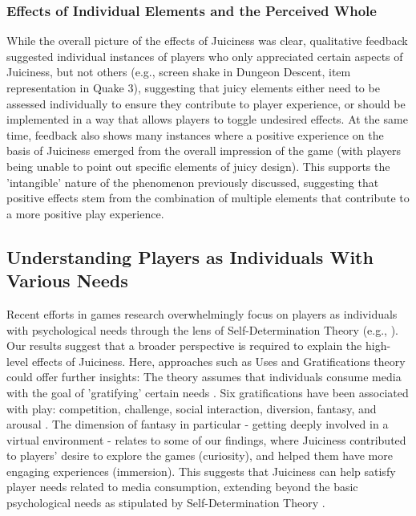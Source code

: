 \documentclass{sigchi}
\begin{document}
\subsubsection{Effects of Individual Elements and the Perceived Whole} While the overall picture of the effects of Juiciness was clear, qualitative feedback suggested individual instances of players who only appreciated certain aspects of Juiciness, but not others (e.g., screen shake in Dungeon Descent, item representation in Quake 3), suggesting that juicy elements either need to be assessed individually to ensure they contribute to player experience, or should be implemented in a way that allows players to toggle undesired effects. At the same time, feedback also shows many instances where a positive experience on the basis of Juiciness emerged from the overall impression of the game (with players being unable to point out specific elements of juicy design). This supports the 'intangible' nature of the phenomenon previously discussed, suggesting that positive effects stem from the combination of multiple elements that contribute to a more positive play experience.

\subsection{Understanding Players as Individuals With Various Needs}
Recent efforts in games research overwhelmingly focus on players as individuals with psychological needs through the lens of Self-Determination Theory (e.g., \cite{JOHNSON2016805,vella2017motivating}). Our results suggest that a broader perspective is required to explain the high-level effects of Juiciness. Here, approaches such as Uses and Gratifications theory could offer further insights: The theory assumes that individuals consume media with the goal of 'gratifying' certain needs \cite{lin1999uses,ruggiero2000uses}. Six gratifications have been associated with play: competition, challenge, social interaction, diversion, fantasy, and arousal \cite{sherry2006video}. The dimension of fantasy in particular - getting deeply involved in a virtual environment - relates to some of our findings, where Juiciness contributed to players' desire to explore the games (curiosity), and helped them have more engaging experiences (immersion). This suggests that Juiciness can help satisfy player needs related to media consumption, extending beyond the basic psychological needs as stipulated by Self-Determination Theory \cite{przybylski2010motivational}.
\end{document}
